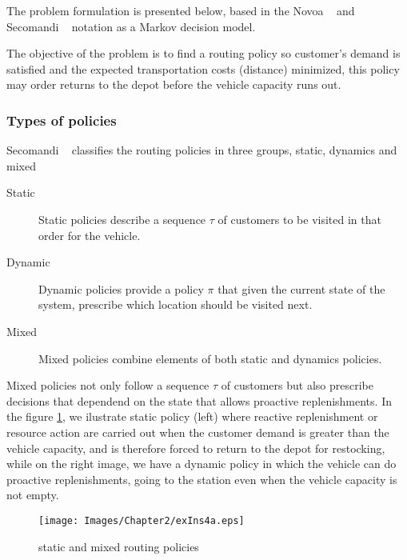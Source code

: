 The problem formulation is presented below, based in the Novoa ~\cite{novoa_approximate_2009} and Secomandi ~\cite{secomandi_rollout_2001} notation as a Markov decision model.

The objective of the problem is to find a routing policy so customer's demand is satisfied and the expected transportation costs (distance) minimized, this policy may order returns to the depot before the vehicle capacity runs out.

\subsubsection{Types of policies}

Secomandi ~\cite{secomandi_comparing_2000} classifies the routing policies in three groups, static, dynamics and mixed

\begin{description}
  \item[Static] Static policies describe a sequence $\tau$ of customers to be visited in that order for the vehicle.
  \item[Dynamic] Dynamic policies provide a policy $\pi$ that given the current state of the system, prescribe which location should be visited next.
  \item[Mixed] Mixed policies combine elements of both static and dynamics policies.
\end{description}

Mixed policies not only follow a sequence $\tau$ of customers but also prescribe decisions that dependend on the state that allows proactive replenishments. In the figure \ref{fig:routing_policies}, we ilustrate static policy (left) where reactive replenishment or resource action are carried out when the customer demand is greater than the vehicle capacity, and  is therefore forced to return to the depot for restocking, while on the right image, we have a dynamic policy in which the vehicle can do proactive replenishments, going to the station even when the vehicle capacity is not empty.

\begin{figure}[!htbp]
  \begin{center}
   \texttt{[image: Images/Chapter2/exIns4a.eps]}
  \end{center}
    \caption{static and mixed routing policies}\label{fig:routing_policies}
\end{figure}

